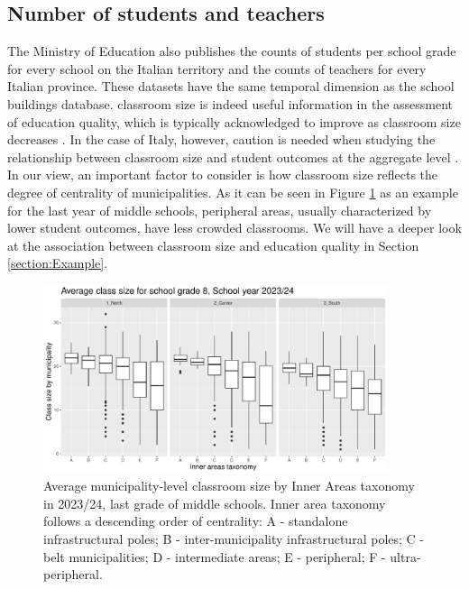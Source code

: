\documentclass[openany]{book}
\begin{document}
\subsection{Number of students and teachers} \label{par:nstud}
The Ministry of Education also publishes the counts of students per school grade for every school on the Italian territory and the counts of teachers for every Italian province. These datasets have the same temporal dimension as the school buildings database. classroom size is indeed useful information in the assessment of education quality, which is typically acknowledged to improve as classroom size decreases \citep{Blatchford, Bruhwiler}. In the case of Italy, however, caution is needed when studying the relationship between classroom size and student outcomes at the aggregate level \citep{Angrist}. In our view, an important factor to consider is how classroom size reflects the degree of centrality of municipalities. As it can be seen in Figure \ref{fig:nstud_bp_8} as an example for the last year of middle schools, peripheral areas, usually characterized by lower student outcomes, have less crowded classrooms. We will have a deeper look at the association between classroom size and education quality in Section \ref{section:Example}.
\begin{figure}
  \centering
  \includegraphics[width = 0.9\textwidth]{SchoolDataIT/Fig4.pdf} 
  \caption{Average municipality-level classroom size by Inner Areas taxonomy in 2023/24, last grade of middle schools. Inner area taxonomy follows a descending order of centrality: A - standalone infrastructural poles; B - inter-municipality infrastructural poles; C - belt municipalities; D - intermediate areas; E - peripheral; F - ultra-peripheral.}
  \label{fig:nstud_bp_8}
\end{figure}
\end{document}
